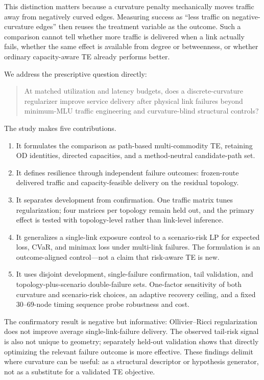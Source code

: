 \documentclass[preprint,12pt]{elsarticle}
\begin{document}
This distinction matters because a curvature penalty mechanically moves traffic
away from negatively curved edges. Measuring success as ``less traffic on
negative-curvature edges'' then reuses the treatment variable as the outcome.
Such a comparison cannot tell whether more traffic is delivered when a link
actually fails, whether the same effect is available from degree or
betweenness, or whether ordinary capacity-aware TE already performs better.

We address the prescriptive question directly:

\begin{quote}
At matched utilization and latency budgets, does a discrete-curvature
regularizer improve service delivery after physical link failures beyond
minimum-MLU traffic engineering and curvature-blind structural controls?
\end{quote}

The study makes five contributions.

\begin{enumerate}
\item It formulates the comparison as path-based multi-commodity TE, retaining
OD identities, directed capacities, and a method-neutral candidate-path set.
\item It defines resilience through independent failure outcomes: frozen-route
delivered traffic and capacity-feasible delivery on the residual topology.
\item It separates development from confirmation. One traffic matrix tunes
regularization; four matrices per topology remain held out, and the primary
effect is tested with topology-level rather than link-level inference.
\item It generalizes a single-link exposure control to a scenario-risk LP for
expected loss, CVaR, and minimax loss under multi-link failures. The formulation
is an outcome-aligned control---not a claim that risk-aware TE is new.
\item It uses disjoint development, single-failure confirmation, tail
validation, and topology-plus-scenario double-failure sets. One-factor
sensitivity of both curvature and scenario-risk choices, an adaptive recovery
ceiling, and a fixed 30--69-node timing sequence probe robustness and cost.
\end{enumerate}

The confirmatory result is negative but informative: Ollivier--Ricci
regularization does not improve average single-link-failure delivery. The
observed tail-risk signal is also not unique to geometry; separately held-out
validation shows that directly optimizing the relevant failure outcome is more
effective. These findings delimit where
curvature can be useful: as a structural descriptor or hypothesis generator,
not as a substitute for a validated TE objective.
\end{document}
